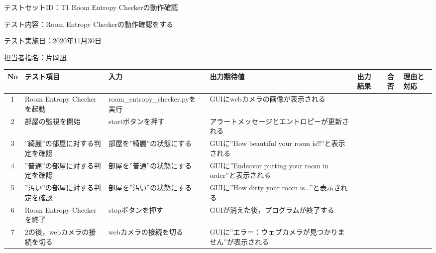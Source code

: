 テストセットID：T1 Room Entropy Checkerの動作確認

テスト内容：Room Entropy Checkerの動作確認をする

テスト実施日：2020年11月30日

担当者指名：片岡凪


\begin{table}[H]
    \centering
    \begin{tabular}{|c|p{11em}|p{11em}|p{7em}|p{6em}|c|p{5em}|} \hline
        No & テスト項目 & 入力 & 出力期待値 & 出力結果 & 合否 & 理由と対応 \\ \hline
        1 & Room Entropy Checkerを起動 & room\_entropy\_checker.pyを実行 & GUIにwebカメラの画像が表示される &  &  & \\ \hline
        2 & 部屋の監視を開始 & startボタンを押す & アラートメッセージとエントロピーが更新される &  &  & \\ \hline
        3 & ”綺麗”の部屋に対する判定を確認 & 部屋を”綺麗”の状態にする & GUIに”How beautiful your room is!!”と表示される &  &  & \\ \hline
        4 & ”普通”の部屋に対する判定を確認 & 部屋を”普通”の状態にする & GUIに”Endeavor putting your room in order”と表示される &  &  & \\ \hline
        5 & ”汚い”の部屋に対する判定を確認 & 部屋を”汚い”の状態にする & GUIに”How dirty your room is...”と表示される &  &  & \\ \hline
        6 & Room Entropy Checkerを終了 & stopボタンを押す & GUIが消えた後，プログラムが終了する &  &  & \\ \hline
        7 & 2の後，webカメラの接続を切る & webカメラの接続を切る & GUIに”エラー：ウェブカメラが見つかりません”が表示される &  &  & \\ \hline
    \end{tabular}
    \label{tab:test_set1}
\end{table}